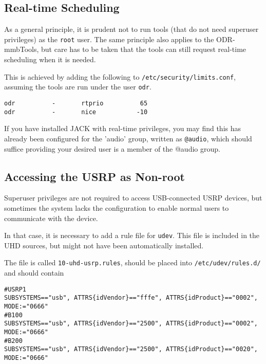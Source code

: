 \subsection{Real-time Scheduling}

As a general principle, it is prudent not to run tools (that do not need superuser
privileges) as the \texttt{root} user. The same principle also applies to the 
ODR-mmbTools, but care has to be taken that the tools can still request real-time
scheduling when it is needed.

This is achieved by adding the following to \texttt{/etc/security/limits.conf},
assuming the tools are run under the user \texttt{odr}.

\begin{lstlisting}
odr          -       rtprio          65
odr          -       nice           -10
\end{lstlisting}

If you have installed JACK with real-time privileges, you may find this has 
already been configured for the 'audio' group, written as \texttt{@audio}, which
should suffice providing your desired user is a member of the @audio group.

\subsection{Accessing the USRP as Non-root}

Superuser privileges are not required to access USB-connected USRP devices, but
sometimes the system lacks the configuration to enable normal users to
communicate with the device.

In that case, it is necessary to add a rule file for \texttt{udev}. This file is
included in the UHD sources, but might not have been automatically installed.

The file is called \texttt{10-uhd-usrp.rules}, should be placed into
\texttt{/etc/udev/rules.d/} and should contain
{ \footnotesize
\begin{verbatim}
#USRP1
SUBSYSTEMS=="usb", ATTRS{idVendor}=="fffe", ATTRS{idProduct}=="0002", MODE:="0666"
#B100
SUBSYSTEMS=="usb", ATTRS{idVendor}=="2500", ATTRS{idProduct}=="0002", MODE:="0666"
#B200
SUBSYSTEMS=="usb", ATTRS{idVendor}=="2500", ATTRS{idProduct}=="0020", MODE:="0666"
\end{verbatim}
}

